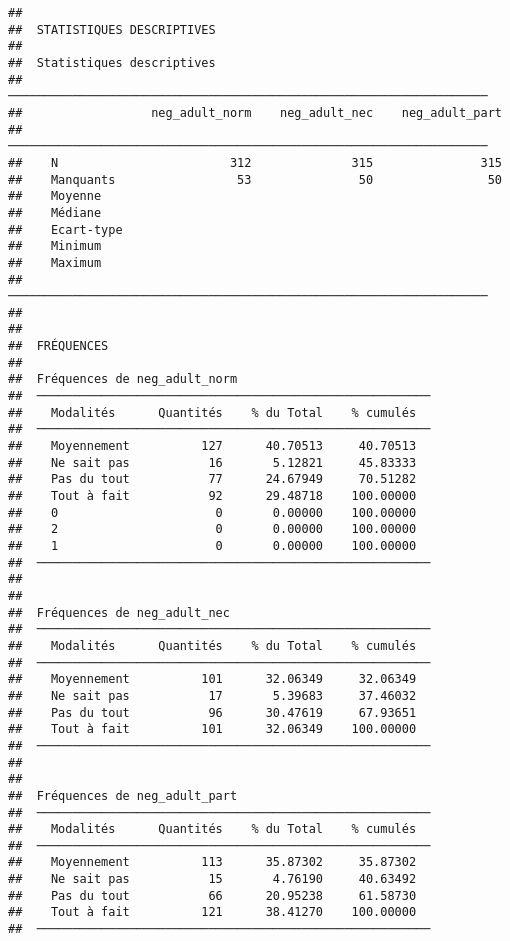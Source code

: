 \documentclass[
]{article}
\begin{document}
\begin{verbatim}
## 
##  STATISTIQUES DESCRIPTIVES
## 
##  Statistiques descriptives                                           
##  ─────────────────────────────────────────────────────────────────── 
##                  neg_adult_norm    neg_adult_nec    neg_adult_part   
##  ─────────────────────────────────────────────────────────────────── 
##    N                        312              315               315   
##    Manquants                 53               50                50   
##    Moyenne                                                           
##    Médiane                                                           
##    Ecart-type                                                        
##    Minimum                                                           
##    Maximum                                                           
##  ─────────────────────────────────────────────────────────────────── 
## 
## 
##  FRÉQUENCES
## 
##  Fréquences de neg_adult_norm                            
##  ─────────────────────────────────────────────────────── 
##    Modalités      Quantités    % du Total    % cumulés   
##  ─────────────────────────────────────────────────────── 
##    Moyennement          127      40.70513     40.70513   
##    Ne sait pas           16       5.12821     45.83333   
##    Pas du tout           77      24.67949     70.51282   
##    Tout à fait           92      29.48718    100.00000   
##    0                      0       0.00000    100.00000   
##    2                      0       0.00000    100.00000   
##    1                      0       0.00000    100.00000   
##  ─────────────────────────────────────────────────────── 
## 
## 
##  Fréquences de neg_adult_nec                             
##  ─────────────────────────────────────────────────────── 
##    Modalités      Quantités    % du Total    % cumulés   
##  ─────────────────────────────────────────────────────── 
##    Moyennement          101      32.06349     32.06349   
##    Ne sait pas           17       5.39683     37.46032   
##    Pas du tout           96      30.47619     67.93651   
##    Tout à fait          101      32.06349    100.00000   
##  ─────────────────────────────────────────────────────── 
## 
## 
##  Fréquences de neg_adult_part                            
##  ─────────────────────────────────────────────────────── 
##    Modalités      Quantités    % du Total    % cumulés   
##  ─────────────────────────────────────────────────────── 
##    Moyennement          113      35.87302     35.87302   
##    Ne sait pas           15       4.76190     40.63492   
##    Pas du tout           66      20.95238     61.58730   
##    Tout à fait          121      38.41270    100.00000   
##  ───────────────────────────────────────────────────────
\end{verbatim}
\end{document}
